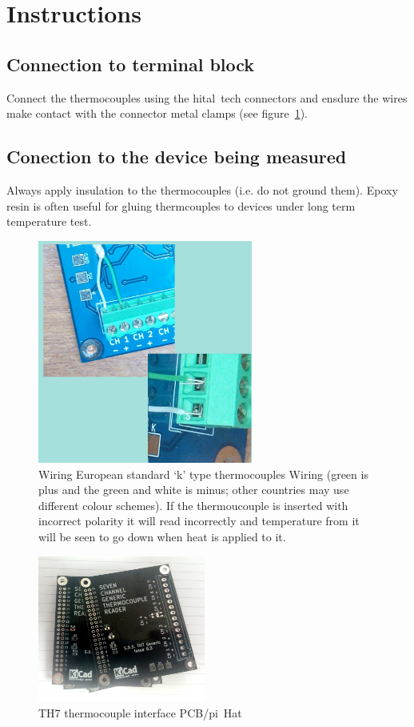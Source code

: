 \documentclass[a4paper,10pt]{article}
\begin{document}
\section{Instructions}
\subsection{Connection to terminal block}
Connect the thermocouples using the hital~tech connectors and ensdure the wires make contact with the 
connector metal clamps (see figure~\ref{fig:con}).
\subsection{Conection to the device being measured}
Always apply insulation to the thermocouples (i.e. do not ground them).
Epoxy resin is often useful for gluing thermcouples to devices under long term temperature test.

\begin{figure}[h]
 \centering
 \includegraphics[width=200pt]{./wiring.jpg}
 \caption{Wiring European standard `k' type thermocouples Wiring (green is plus and the green and white is minus; other countries may use different colour schemes). 
 If the thermoucouple is inserted with incorrect polarity it will read incorrectly and temperature from it will be seen to go down when heat is applied to it.}
 \label{fig:con}
\end{figure}

\begin{figure}[h]
 \centering
 \includegraphics[width=156pt]{./TH7_0p3.jpg}
 \caption{TH7 thermocouple interface PCB/pi~Hat}
 \label{fig:th7}
\end{figure}
\end{document}
